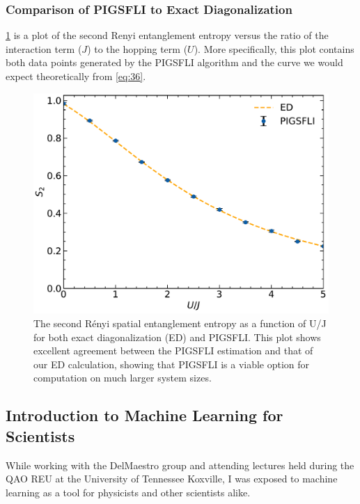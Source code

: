 \subsubsection{Comparison of PIGSFLI to Exact Diagonalization} \label{results}

\cref*{fig:renyi_spatial} is a plot of the second Renyi entanglement entropy versus the ratio of the interaction term ($J$) to the hopping term ($U$). More specifically, this plot contains both data points generated by the PIGSFLI algorithm and the curve we would expect theoretically from \cref{eq:36}.

\begin{figure}[H]
\centering
\includegraphics[scale=0.5]{../figures/renyi_spatial.pdf}
\caption{The second Rényi spatial entanglement entropy as a function of U/J for both exact diagonalization (ED) and PIGSFLI. This plot shows excellent agreement between the PIGSFLI estimation and that of our ED calculation, showing that PIGSFLI is a viable option for computation on much larger system sizes.}
\label{fig:renyi_spatial}
\end{figure}

\subsection{Introduction to Machine Learning for Scientists}
While working with the DelMaestro group and attending lectures held during the QAO REU at the University of Tennessee Koxville, I was exposed to machine learning as a tool for physicists and other scientists alike. 

